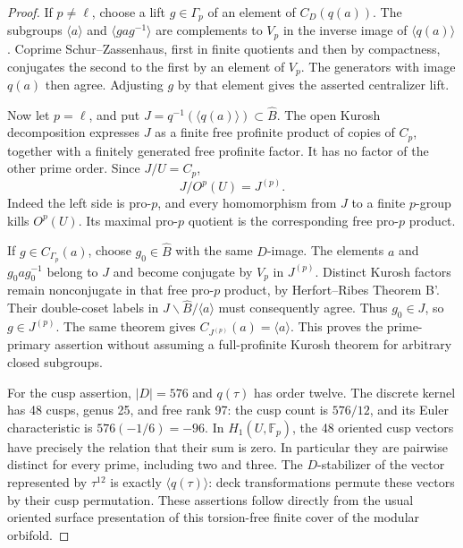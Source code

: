\begin{proof}
If \(p\ne\ell\), choose a lift \(g\in\Gamma_p\)
of an element of \(C_D(q(a))\). The subgroups
\(\langle a\rangle\) and
\(\langle gag^{-1}\rangle\) are complements to
\(V_p\) in the inverse image of \(\langle q(a)\rangle\).
Coprime Schur--Zassenhaus, first in finite quotients
and then by compactness, conjugates the second to
the first by an element of \(V_p\). The generators
with image \(q(a)\) then agree. Adjusting \(g\)
by that element gives the asserted centralizer lift.

Now let \(p=\ell\), and put
\(J=q^{-1}(\langle q(a)\rangle)\subset\widehat B\).
The open Kurosh decomposition expresses \(J\) as
a finite free profinite product of copies of
\(C_p\), together with a finitely generated free
profinite factor. It has no factor of the other
prime order. Since \(J/U=C_p\),
\[
          J/O^p(U)=J^{(p)}.
\]
Indeed the left side is pro-\(p\), and every
homomorphism from \(J\) to a finite \(p\)-group
kills \(O^p(U)\). Its maximal pro-\(p\) quotient
is the corresponding free pro-\(p\) product.

If \(g\in C_{\Gamma_p}(a)\), choose
\(g_0\in\widehat B\) with the same \(D\)-image.
The elements \(a\) and \(g_0ag_0^{-1}\) belong
to \(J\) and become conjugate by \(V_p\) in
\(J^{(p)}\). Distinct Kurosh factors remain
nonconjugate in that free pro-\(p\) product,
by Herfort--Ribes Theorem B'. Their double-coset
labels in \(J\backslash\widehat B/\langle a\rangle\)
must consequently agree. Thus \(g_0\in J\),
so \(g\in J^{(p)}\). The same theorem gives
\(C_{J^{(p)}}(a)=\langle a\rangle\).
This proves the prime-primary assertion without
assuming a full-profinite Kurosh theorem for
arbitrary closed subgroups.\cite{A_HR1985}

For the cusp assertion, \(|D|=576\) and
\(q(\tau)\) has order twelve. The discrete kernel
has 48 cusps, genus 25, and free rank 97:
the cusp count is \(576/12\), and its Euler
characteristic is \(576(-1/6)=-96\).
In \(H_1(U,\mathbb F_p)\), the 48 oriented cusp
vectors have precisely the relation that their
sum is zero. In particular they are pairwise
distinct for every prime, including two and three.
The \(D\)-stabilizer of the vector represented
by \(\tau^{12}\) is exactly
\(\langle q(\tau)\rangle\): deck transformations
permute these vectors by their cusp permutation.
These assertions follow directly from the usual
oriented surface presentation of this torsion-free
finite cover of the modular orbifold.


\end{proof}
